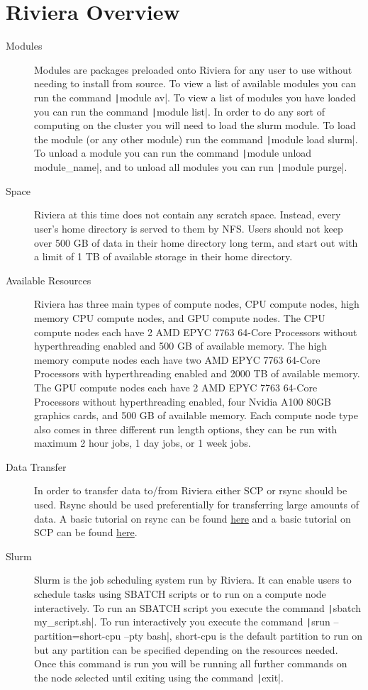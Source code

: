 \documentclass[11pt,letterpaper]{article}
\begin{document}
\section{Riviera Overview}
\begin{description}
    \item[Modules] Modules are packages preloaded onto Riviera for any user to use without needing to install from source. To view a list of available modules you can run the command \texttt|module av|. To view a list of modules you have loaded you can run the command \texttt|module list|. In order to do any sort of computing on the cluster you will need to load the slurm module. To load the module (or any other module) run the command \texttt|module load slurm|. To unload a module you can run the command \texttt|module unload module_name|, and to unload all modules you can run \texttt|module purge|.
    \item[Space] Riviera at this time does not contain any scratch space. Instead, every user's home directory is served to them by NFS. Users should not keep over 500 GB of data in their home directory long term, and start out with a limit of 1 TB of available storage in their home directory.
    \item[Available Resources] Riviera has three main types of compute nodes, CPU compute nodes, high memory CPU compute nodes, and GPU compute nodes. The CPU compute nodes each have 2 AMD EPYC 7763 64-Core Processors without hyperthreading enabled and 500 GB of available memory. The high memory compute nodes each have two AMD EPYC 7763 64-Core Processors with hyperthreading enabled and 2000 TB of available memory. The GPU compute nodes each have 2 AMD EPYC 7763 64-Core Processors without hyperthreading enabled, four Nvidia A100 80GB graphics cards, and 500 GB of available memory. Each compute node type also comes in three different run length options, they can be run with maximum 2 hour jobs, 1 day jobs, or 1 week jobs.
    \item[Data Transfer] In order to transfer data to/from Riviera either SCP or rsync should be used. Rsync should be used preferentially for transferring large amounts of data. A basic tutorial on rsync can be found \href{https://linuxize.com/post/how-to-use-rsync-for-local-and-remote-data-transfer-and-synchronization/}{here} and a basic tutorial on SCP can be found \href{https://linuxize.com/post/how-to-use-scp-command-to-securely-transfer-files/}{here}.
    \item[Slurm] Slurm is the job scheduling system run by Riviera. It can enable users to schedule tasks using SBATCH scripts or to run on a compute node interactively. To run an SBATCH script you execute the command \texttt|sbatch my_script.sh|. To run interactively you execute the command \texttt|srun --partition=short-cpu --pty bash|, short-cpu is the default partition to run on but any partition can be specified depending on the resources needed. Once this command is run you will be running all further commands on the node selected until exiting using the command \texttt|exit|. 

\end{description}
\end{document}
